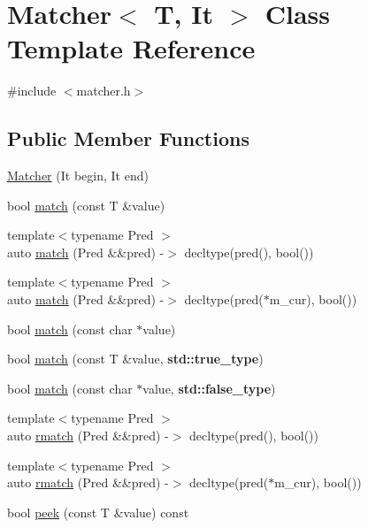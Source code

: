 \hypertarget{class_matcher}{}\section{Matcher$<$ T, It $>$ Class Template Reference}
\label{class_matcher}


{\ttfamily \#include $<$matcher.\+h$>$}

\subsection*{Public Member Functions}
\begin{DoxyCompactItemize}
\item 
\hyperlink{class_matcher_a6a90be25ea49908ed9d6c23f8bb9c47f}{Matcher} (It begin, It end)
\item 
bool \hyperlink{class_matcher_ad10d558fa9248baf4490d50ad395a55e}{match} (const T \&value)
\item 
{\footnotesize template$<$typename Pred $>$ }\\auto \hyperlink{class_matcher_a1f088e17e646f4e53a9d0297b4bd4d8b}{match} (Pred \&\&pred) -\/$>$ decltype(pred(), bool())
\item 
{\footnotesize template$<$typename Pred $>$ }\\auto \hyperlink{class_matcher_aae9b912f87795d05054746619e237b2d}{match} (Pred \&\&pred) -\/$>$ decltype(pred($\ast$m\+\_\+cur), bool())
\item 
bool \hyperlink{class_matcher_adeb27a509701a96d922d98ade0080bcd}{match} (const char $\ast$value)
\item 
bool \hyperlink{class_matcher_acf713afbc98dd0b324ed04f52ccad568}{match} (const T \&value, \textbf{ std\+::true\+\_\+type})
\item 
bool \hyperlink{class_matcher_a0abb0a8d3e921a4fe96fdd8646e7afd7}{match} (const char $\ast$value, \textbf{ std\+::false\+\_\+type})
\item 
{\footnotesize template$<$typename Pred $>$ }\\auto \hyperlink{class_matcher_a016cf13b6cf1119494a9723fb9419fd4}{rmatch} (Pred \&\&pred) -\/$>$ decltype(pred(), bool())
\item 
{\footnotesize template$<$typename Pred $>$ }\\auto \hyperlink{class_matcher_ad0b897b87cede7752c385e7d55bcaff4}{rmatch} (Pred \&\&pred) -\/$>$ decltype(pred($\ast$m\+\_\+cur), bool())
\item 
bool \hyperlink{class_matcher_a28b154cbc4cb7ae203810043e069ae38}{peek} (const T \&value) const

\end{DoxyCompactItemize}
